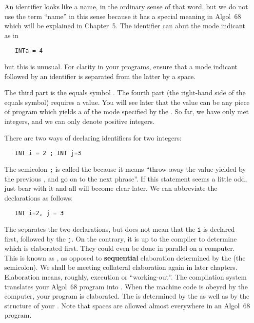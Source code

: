 An identifier looks like a name, in the ordinary sense of that word,
but we do not use the term ``name'' in this sense because it has a
special meaning in Algol~68 which will be explained in Chapter~5. The
identifier can abut the mode indicant as in
\begin{verbatim}
   INTa = 4
\end{verbatim}
\noindent
but this is unusual. For clarity in your programs, ensure that a
mode indicant followed by an identifier is separated from the latter
by a space.

The third part is the equals symbol \ixtt{=}. The fourth part (the
right-hand side of the equals symbol) requires a value. You will see
later that the value can be any piece of program which yields a
 of the mode specified by the
. So far, we have only met integers,
and we can only denote positive integers.

There are two ways of declaring identifiers for two integers:
\begin{verbatim}
   INT i = 2 ; INT j=3
\end{verbatim}
\noindent
The semicolon \verb|;| is called the
 because it means ``throw
away the value yielded by the previous , and go on to the
next phrase''.  If this statement seems a little odd, just bear with
it and all will become clear later.  We can abbreviate the
declarations as follows:
\begin{verbatim}
   INT i=2, j = 3
\end{verbatim}
\noindent
The  separates the two declarations, but does not mean that
the \verb|i| is declared first, followed by the \verb|j|.  On the
contrary, it is up to the compiler to determine which
 is elaborated first.  They could even be done in
parallel on a  computer.
This is known as ,
as opposed to \textbf{sequential} elaboration determined by the
 (the semicolon). We shall
be meeting collateral elaboration again in later chapters.
Elaboration means, roughly, execution or ``working-out''.  The
compilation system translates your Algol~68 program into
.  When the machine code is obeyed by the computer,
your program is elaborated.  The
 is determined
by the  as well as by the structure of your
.  Note that spaces are allowed almost
everywhere in an Algol~68 program.

